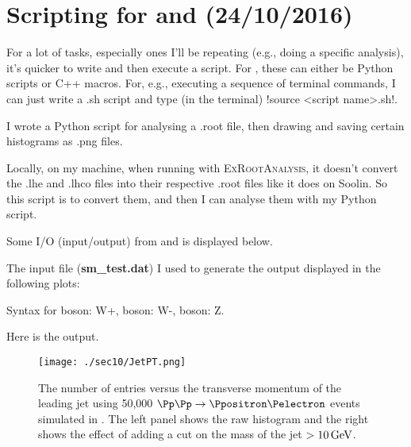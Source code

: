 
\chapter{Scripting for \madgraph and \ROOT (24/10/2016)}

For a lot of tasks, especially ones I'll be repeating (e.g., doing a specific analysis), it's quicker to write and then execute a script. For \ROOT, these can either be Python scripts or C++ macros. For, e.g., executing a sequence of terminal commands, I can just write a .sh script and type (in the terminal) !source <script name>.sh!.

I wrote a Python script for analysing a .root file, then drawing and saving certain histograms as .png files.



Locally, on my machine, when running \madgraph with \textsc{ExRootAnalysis}, it doesn't convert the .lhe and .lhco files into their respective .root files like it does on Soolin. So this script is to convert them, and then I can analyse them with my Python script.



Some I/O (input/output) from \madgraph and \ROOT is displayed below.

The input file (\textbf{sm\_test.dat}) I used to generate the output displayed in the following plots:



Syntax for \PWplus boson: W+, \PWminus boson: W-, \PZzero boson: Z.

Here is the output.

\begin{figure}[htbp]
\centering
\texttt{[image: ./sec10/JetPT.png]}
\caption{The number of entries versus the transverse momentum of the leading jet using 50,000 $\Pp\Pp \rightarrow \Ppositron \Pelectron$ events simulated in \madgraph. The left panel shows the raw histogram and the right shows the effect of adding a cut on the mass of the jet $>10\,\text{G\text{e\kern-0.15ex V}}$.}
\end{figure}

